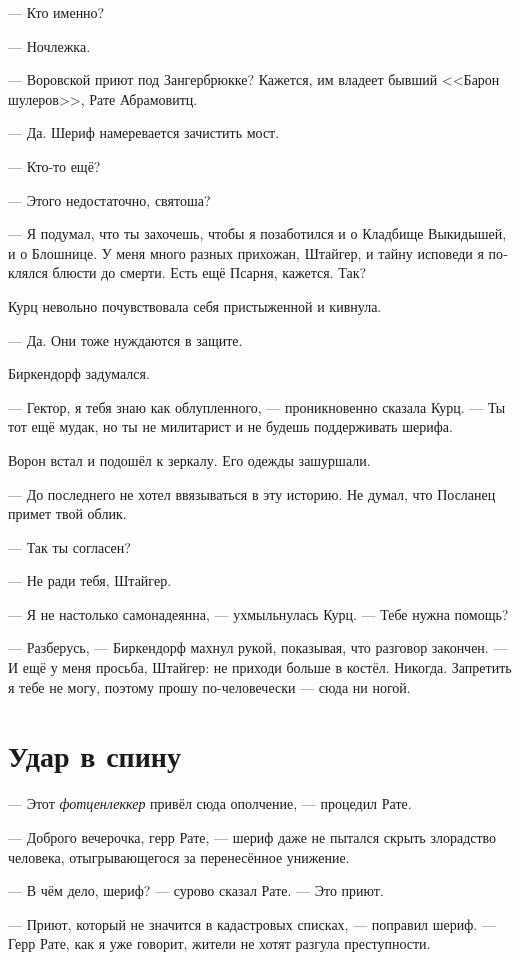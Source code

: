 \documentclass[a4paper,12pt,fleqn]{book}\usepackage{cooltooltips}\usepackage{polyglossia}\setdefaultlanguage[babelshorthands=true]{russian}\setotherlanguage{english}\defaultfontfeatures{Ligatures=TeX,Mapping=tex-text} \usepackage{xcolor}\definecolor{lightgray}{HTML}{bbbbbb}\color{lightgray}\newcommand{\ml}[3]{\textenglish{\textcolor{black}{#3}}}
\begin{document}
--- Кто именно?

--- Ночлежка.

--- Воровской приют под Зангербрюкке?
Кажется, им владеет бывший <<Барон шулеров>>, Рате Абрамовитц.

--- Да.
Шериф намеревается зачистить мост.

--- Кто-то ещё?

--- Этого недостаточно, святоша?

--- Я подумал, что ты захочешь, чтобы я позаботился и о Кладбище Выкидышей, и о Блошнице.
У меня много разных прихожан, Штайгер, и тайну исповеди я поклялся блюсти до смерти.
Есть ещё Псарня, кажется.
Так?

Курц невольно почувствовала себя пристыженной и кивнула.

--- Да.
Они тоже нуждаются в защите.

Биркендорф задумался.

--- Гектор, я тебя знаю как облупленного, --- проникновенно сказала Курц.
--- Ты тот ещё мудак, но ты не милитарист и не будешь поддерживать шерифа.

Ворон встал и подошёл к зеркалу.
Его одежды зашуршали.

--- До последнего не хотел ввязываться в эту историю.
Не думал, что Посланец примет твой облик.

--- Так ты согласен?

--- Не ради тебя, Штайгер.

--- Я не настолько самонадеянна, --- ухмыльнулась Курц.
--- Тебе нужна помощь?

--- Разберусь, --- Биркендорф махнул рукой, показывая, что разговор закончен.
--- И ещё у меня просьба, Штайгер: не приходи больше в костёл.
Никогда.
Запретить я тебе не могу, поэтому прошу по-человечески --- сюда ни ногой.

\section{Удар в спину}

--- Этот \textit{фотценлеккер} привёл сюда ополчение, --- процедил Рате.

--- Доброго вечерочка, герр Рате, --- шериф даже не пытался скрыть злорадство человека, отыгрывающегося за перенесённое унижение.

--- В чём дело, шериф? --- сурово сказал Рате.
--- Это приют.

--- Приют, который не значится в кадастровых списках, --- поправил шериф.
--- Герр Рате, как я уже говорит, жители не хотят разгула преступности.
\end{document}
